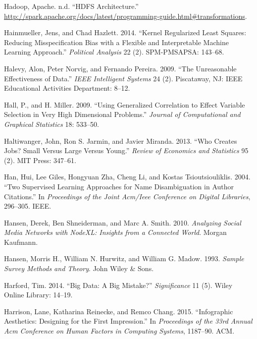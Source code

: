 \documentclass[]{krantz}
\begin{document}
\hypertarget{ref-SparkTransformation}{}
Hadoop, Apache. n.d. ``HDFS Architecture.''
\url{http://spark.apache.org/docs/latest/programming-guide.html\#transformations}.

\hypertarget{ref-hainmueller2014kernel}{}
Hainmueller, Jens, and Chad Hazlett. 2014. ``Kernel Regularized Least
Squares: Reducing Misspecification Bias with a Flexible and
Interpretable Machine Learning Approach.'' \emph{Political Analysis} 22
(2). SPM-PMSAPSA: 143--68.

\hypertarget{ref-halevy-09}{}
Halevy, Alon, Peter Norvig, and Fernando Pereira. 2009. ``The
Unreasonable Effectiveness of Data.'' \emph{IEEE Intelligent Systems} 24
(2). Piscataway, NJ: IEEE Educational Activities Department: 8--12.

\hypertarget{ref-HallMiller2009}{}
Hall, P., and H. Miller. 2009. ``Using Generalized Correlation to Effect
Variable Selection in Very High Dimensional Problems.'' \emph{Journal of
Computational and Graphical Statistics} 18: 533--50.

\hypertarget{ref-haltiwanger2013creates}{}
Haltiwanger, John, Ron S. Jarmin, and Javier Miranda. 2013. ``Who
Creates Jobs? Small Versus Large Versus Young.'' \emph{Review of
Economics and Statistics} 95 (2). MIT Press: 347--61.

\hypertarget{ref-han2004two}{}
Han, Hui, Lee Giles, Hongyuan Zha, Cheng Li, and Kostas
Tsioutsiouliklis. 2004. ``Two Supervised Learning Approaches for Name
Disambiguation in Author Citations.'' In \emph{Proceedings of the Joint
Acm/Ieee Conference on Digital Libraries}, 296--305. IEEE.

\hypertarget{ref-hansen2010analyzing}{}
Hansen, Derek, Ben Shneiderman, and Marc A. Smith. 2010. \emph{Analyzing
Social Media Networks with NodeXL: Insights from a Connected World}.
Morgan Kaufmann.

\hypertarget{ref-hansen1993sample}{}
Hansen, Morris H., William N. Hurwitz, and William G. Madow. 1993.
\emph{Sample Survey Methods and Theory}. John Wiley \& Sons.

\hypertarget{ref-harford2014big}{}
Harford, Tim. 2014. ``Big Data: A Big Mistake?'' \emph{Significance} 11
(5). Wiley Online Library: 14--19.

\hypertarget{ref-harrison2015infographic}{}
Harrison, Lane, Katharina Reinecke, and Remco Chang. 2015. ``Infographic
Aesthetics: Designing for the First Impression.'' In \emph{Proceedings
of the 33rd Annual Acm Conference on Human Factors in Computing
Systems}, 1187--90. ACM.
\end{document}

